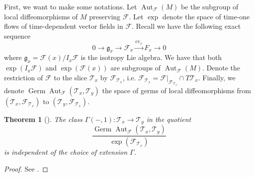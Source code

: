\documentclass[12pt]{amsart}
\newtheorem{thm}{Theorem}[section]
\theoremstyle{definition}
\theoremstyle{remark}
\numberwithin{equation}{section}
\newcommand{\CF}{{\mathcal F}}
\newcommand{\1}{{\mathbb{1}}}
\newcommand{\g}{\mathfrak{g}}
\newcommand{\germ}{\operatorname{Germ}}
\newcommand{\aut}{\operatorname{Aut}}
\newcommand{\ev}{\operatorname{ev}}
\begin{document}
First, we want to make some notations. Let $\aut_{\CF}(M)$ be the subgroup of local diffeomorphisms of $M$ preserving $\CF$. Let $\exp$ denote the space of time-one flows of time-dependent vector fields in $\CF$. Recall we have the following exact sequence
\begin{equation*}
    0\to \g_x \to \CF_x \stackrel{\ev_x}{\to }F_x \to 0
\end{equation*}
where $\g_x = \CF(x)/I_x \CF$ is the isotropy Lie algebra. We have that both $\exp(I_x\CF)$ and $\exp(\CF(x))$ are subgroups of  $\aut_{\CF}(M)$. Denote the restriction of $\CF$ to the slice $\mathcal{T}_x$ by $\CF_{\mathcal{T}_x}$, i.e.  $\CF_{\mathcal{T}_x} = \CF|_{\CF_{\mathcal{T}_x}}\cap T\mathcal{T}_x$. Finally, we denote $\germ \aut_{\CF}(\mathcal{T}_x, \mathcal{T}_y)$ the space of germs of local diffeomorphisms from $(\mathcal{T}_x, \CF_{\mathcal{T}_x}) $ to $(\mathcal{T}_y, \CF_{\mathcal{T}_x})$.
\begin{thm}[]
    The class $\Gamma(-, 1): \mathcal{T}_x\to \mathcal{T}_y$ in the quotient 
    \begin{equation}
        \frac{\germ \aut_{\CF}(\mathcal{T}_x, \mathcal{T}_y)}{\exp(\CF_{\mathcal{T}_x})}
    \end{equation}
    is independent of the choice of extension $\Gamma$.
\end{thm}
\begin{proof}
    See \cite[Proposition 2.3]{AZ12}.
\end{proof}
\end{document}
